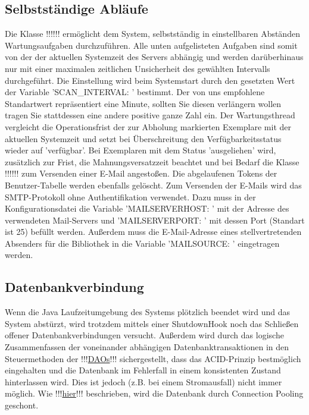 \documentclass{article}
\begin{document}
\subsection{Selbstständige Abläufe}
Die Klasse !!!\hyperlink{Wartungsthread}{}!!! ermöglicht dem System, selbstständig in einstellbaren Abständen Wartungsaufgaben durchzuführen. Alle unten aufgelisteten Aufgaben sind somit von der der aktuellen Systemzeit des Servers abhängig und werden darüberhinaus nur mit einer maximalen zeitlichen Unsicherheit des gewählten Intervalls durchgeführt. Die Einstellung wird beim Systemstart durch den gesetzten Wert der Variable 'SCAN\_INTERVAL: ' bestimmt. Der von uns empfohlene Standartwert repräsentiert eine Minute, sollten Sie diesen verlängern wollen tragen Sie stattdessen eine andere positive ganze Zahl ein. Der Wartungsthread vergleicht die Operationsfrist der zur Abholung markierten Exemplare mit der aktuellen Systemzeit und setzt bei Überschreitung den Verfügbarkeitsstatus wieder auf 'verfügbar'. Bei Exemplaren mit dem Status 'ausgeliehen' wird, zusätzlich zur Frist, die Mahnungsversatzzeit beachtet und bei Bedarf die Klasse !!!\hyperlink{Email}{}!!! zum Versenden einer E-Mail angestoßen. Die abgelaufenen Tokens der Benutzer-Tabelle werden ebenfalls gelöscht. Zum Versenden der E-Mails wird das SMTP-Protokoll ohne Authentifikation verwendet. Dazu muss in der Konfigurationsdatei die Variable 'MAILSERVERHOST: ' mit der Adresse des verwendeten Mail-Servers und 'MAILSERVERPORT: ' mit dessen Port (Standart ist 25) befüllt werden. Außerdem muss die E-Mail-Adresse eines stellvertretenden Absenders für die Bibliothek in die Variable 'MAILSOURCE: ' eingetragen werden.
\subsection{Datenbankverbindung}
Wenn die Java Laufzeitumgebung des Systems plötzlich beendet wird und das System abstürzt, wird trotzdem mittels einer ShutdownHook noch das Schließen offener Datenbankverbindungen versucht. Außerdem wird durch das logische Zusammenfassen der voneinander abhängigen Datenbanktransaktionen in den Steuermethoden der !!!\hyperlink{}{DAOs}!!! sichergestellt, dass das ACID-Prinzip bestmöglich eingehalten und die Datenbank im Fehlerfall in einem konsistenten Zustand hinterlassen wird. Dies ist jedoch (z.B. bei einem Stromausfall) nicht immer möglich. Wie !!!\hyperlink{Pooling}{hier}!!! beschrieben, wird die Datenbank durch Connection Pooling geschont.
\end{document}
